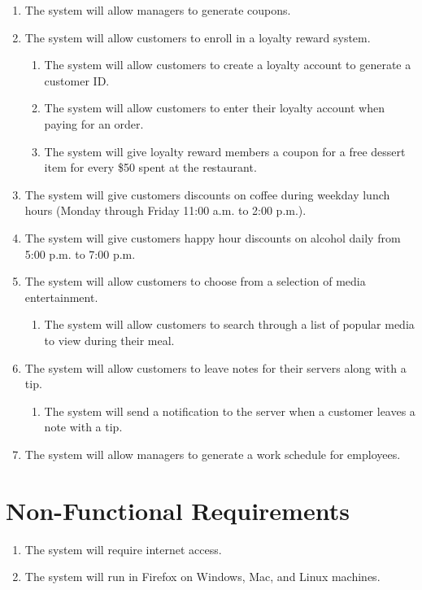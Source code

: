 \documentclass[12pt]{article}
\begin{document}
\begin{enumerate}
			\item The system will allow managers to generate coupons.

			\item The system will allow customers to enroll in a loyalty reward system.
				\begin{enumerate}
					\item The system will allow customers to create a loyalty account to generate a customer ID.
					\item The system will allow customers to enter their loyalty account when paying for an order.
					\item The system will give loyalty reward members a coupon for a free dessert item for every \$50 spent at the restaurant.
				\end{enumerate}

			\item The system will give customers discounts on coffee during weekday lunch hours (Monday through Friday 11:00 a.m. to 2:00 p.m.).
				
			\item The system will give customers happy hour discounts on alcohol daily from 5:00 p.m. to 7:00 p.m.

			\item The system will allow customers to choose from a selection of media entertainment.
				\begin{enumerate}
					\item The system will allow customers to search through a list of popular media to view during their meal.
				\end{enumerate}

			\item The system will allow customers to leave notes for their servers along with a tip.
				\begin{enumerate}
					\item The system will send a notification to the server when a customer leaves a note with a tip.
				\end{enumerate}

			\item The system will allow managers to generate a work schedule for employees.
		\end{enumerate}

	\section{Non-Functional Requirements}
		\begin{enumerate}
			\item The system will require internet access.
			\item The system will run in Firefox on Windows, Mac, and Linux machines.
		\end{enumerate}
\end{document}
